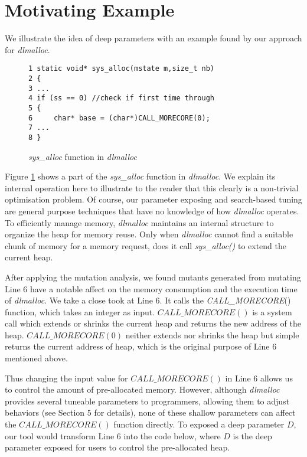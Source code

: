 
\section{Motivating Example}

We illustrate the idea of deep parameters with an example found by our approach for \emph{dlmalloc}.

\begin{figure}[ht]
\begin{lstlisting}
1 static void* sys_alloc(mstate m,size_t nb) 
2 {
3 ...
4 if (ss == 0) //check if first time through
5 { 
6     char* base = (char*)CALL_MORECORE(0);
7 ...
8 }
\end{lstlisting}
\vspace{-1.5em}
\caption{\emph{sys\_alloc} function in \emph{dlmalloc}}
\label{exp}
\end{figure}

Figure \ref{exp} shows a part of the \emph{sys\_alloc} function in \emph{dlmalloc}. We explain its internal operation here to illustrate to the reader that this clearly is a non-trivial optimisation problem. Of course, our parameter exposing and search-based tuning are general purpose techniques that have no knowledge of how \emph{dlmalloc} operates. To efficiently manage memory, \emph{dlmalloc} maintains an internal structure to organize the heap for memory reuse. Only when \emph{dlmalloc} cannot find a suitable chunk of memory for a memory request, does it call \emph{sys\_alloc()} to extend the current heap.

After applying the mutation analysis, we found mutants generated from mutating Line 6 have a notable affect on the memory consumption and the execution time of \emph{dlmalloc}. We take a close took at Line 6. It calls the \emph{CALL\_MORECORE}() function, which takes an integer as input. $CALL\_MORECORE()$ is a system call which extends or shrinks the current heap and returns the new address of the heap. $CALL\_MORECORE(0)$ neither extends nor shrinks the heap but simple returns the current address of heap, which is the original purpose of Line 6 mentioned above.

Thus changing the input value for $CALL\_MORECORE()$ in Line 6 allows us to control the amount of pre-allocated memory. However, although \emph{dlmalloc} provides several tuneable parameters to programmers, allowing them to adjust behaviors (see Section 5 for details), none of these shallow parameters can affect the $CALL\_MORECORE()$ function directly. To exposed a deep parameter $D$, our tool would transform Line 6 into the code below, where $D$ is the deep parameter exposed for users to control the pre-allocated heap.


